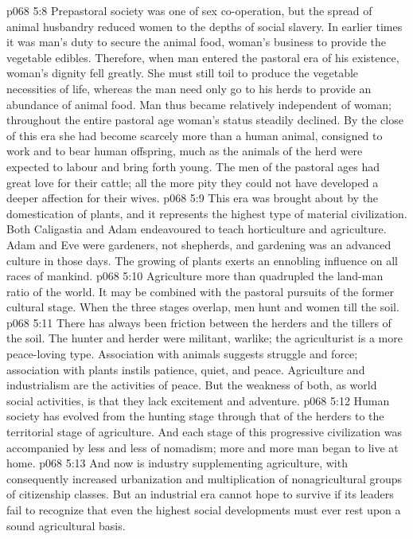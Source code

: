 \vs p068 5:8 Prepastoral society was one of sex co\hyp{}operation, but the spread of animal husbandry reduced women to the depths of social slavery. In earlier times it was man’s duty to secure the animal food, woman’s business to provide the vegetable edibles. Therefore, when man entered the pastoral era of his existence, woman’s dignity fell greatly. She must still toil to produce the vegetable necessities of life, whereas the man need only go to his herds to provide an abundance of animal food. Man thus became relatively independent of woman; throughout the entire pastoral age woman’s status steadily declined. By the close of this era she had become scarcely more than a human animal, consigned to work and to bear human offspring, much as the animals of the herd were expected to labour and bring forth young. The men of the pastoral ages had great love for their cattle; all the more pity they could not have developed a deeper affection for their wives.
\vs p068 5:9 \bibnobreakspace {} This era was brought about by the domestication of plants, and it represents the highest type of material civilization. Both Caligastia and Adam endeavoured to teach horticulture and agriculture. Adam and Eve were gardeners, not shepherds, and gardening was an advanced culture in those days. The growing of plants exerts an ennobling influence on all races of mankind.
\vs p068 5:10 Agriculture more than quadrupled the land\hyp{}man ratio of the world. It may be combined with the pastoral pursuits of the former cultural stage. When the three stages overlap, men hunt and women till the soil.
\vs p068 5:11 There has always been friction between the herders and the tillers of the soil. The hunter and herder were militant, warlike; the agriculturist is a more peace\hyp{}loving type. Association with animals suggests struggle and force; association with plants instils patience, quiet, and peace. Agriculture and industrialism are the activities of peace. But the weakness of both, as world social activities, is that they lack excitement and adventure.
\vs p068 5:12 \pc Human society has evolved from the hunting stage through that of the herders to the territorial stage of agriculture. And each stage of this progressive civilization was accompanied by less and less of nomadism; more and more man began to live at home.
\vs p068 5:13 And now is industry supplementing agriculture, with consequently increased urbanization and multiplication of nonagricultural groups of citizenship classes. But an industrial era cannot hope to survive if its leaders fail to recognize that even the highest social developments must ever rest upon a sound agricultural basis.
